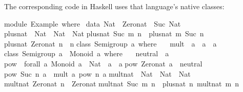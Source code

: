 \begin{isabellebody}
\endisatagquote
{\isafoldquote}%
%
\isadelimquote
%
\endisadelimquote
%
\begin{isamarkuptext}%
\noindent The corresponding code in Haskell uses that language's
  native classes:%
\end{isamarkuptext}%
\isamarkuptrue%
%
\isadelimtypewriter
%
\endisadelimtypewriter
%
\isatagtypewriter
%
\begin{isamarkuptext}%
module\ Example\ where\ {\isacharbraceleft}\isanewline
\isanewline
data\ Nat\ {\isacharequal}\ Zero{\isacharunderscore}nat\ {\isacharbar}\ Suc\ Nat{\isacharsemicolon}\isanewline
\isanewline
plus{\isacharunderscore}nat\ {\isacharcolon}{\isacharcolon}\ Nat\ {\isacharminus}{\isachargreater}\ Nat\ {\isacharminus}{\isachargreater}\ Nat{\isacharsemicolon}\isanewline
plus{\isacharunderscore}nat\ {\isacharparenleft}Suc\ m{\isacharparenright}\ n\ {\isacharequal}\ plus{\isacharunderscore}nat\ m\ {\isacharparenleft}Suc\ n{\isacharparenright}{\isacharsemicolon}\isanewline
plus{\isacharunderscore}nat\ Zero{\isacharunderscore}nat\ n\ {\isacharequal}\ n{\isacharsemicolon}\isanewline
\isanewline
class\ Semigroup\ a\ where\ {\isacharbraceleft}\isanewline
\ \ mult\ {\isacharcolon}{\isacharcolon}\ a\ {\isacharminus}{\isachargreater}\ a\ {\isacharminus}{\isachargreater}\ a{\isacharsemicolon}\isanewline
{\isacharbraceright}{\isacharsemicolon}\isanewline
\isanewline
class\ {\isacharparenleft}Semigroup\ a{\isacharparenright}\ {\isacharequal}{\isachargreater}\ Monoid\ a\ where\ {\isacharbraceleft}\isanewline
\ \ neutral\ {\isacharcolon}{\isacharcolon}\ a{\isacharsemicolon}\isanewline
{\isacharbraceright}{\isacharsemicolon}\isanewline
\isanewline
pow\ {\isacharcolon}{\isacharcolon}\ forall\ a{\isachardot}\ {\isacharparenleft}Monoid\ a{\isacharparenright}\ {\isacharequal}{\isachargreater}\ Nat\ {\isacharminus}{\isachargreater}\ a\ {\isacharminus}{\isachargreater}\ a{\isacharsemicolon}\isanewline
pow\ Zero{\isacharunderscore}nat\ a\ {\isacharequal}\ neutral{\isacharsemicolon}\isanewline
pow\ {\isacharparenleft}Suc\ n{\isacharparenright}\ a\ {\isacharequal}\ mult\ a\ {\isacharparenleft}pow\ n\ a{\isacharparenright}{\isacharsemicolon}\isanewline
\isanewline
mult{\isacharunderscore}nat\ {\isacharcolon}{\isacharcolon}\ Nat\ {\isacharminus}{\isachargreater}\ Nat\ {\isacharminus}{\isachargreater}\ Nat{\isacharsemicolon}\isanewline
mult{\isacharunderscore}nat\ Zero{\isacharunderscore}nat\ n\ {\isacharequal}\ Zero{\isacharunderscore}nat{\isacharsemicolon}\isanewline
mult{\isacharunderscore}nat\ {\isacharparenleft}Suc\ m{\isacharparenright}\ n\ {\isacharequal}\ plus{\isacharunderscore}nat\ n\ {\isacharparenleft}mult{\isacharunderscore}nat\ m\ n{\isacharparenright}{\isacharsemicolon}\isanewline

\end{isamarkuptext}
\end{isabellebody}
